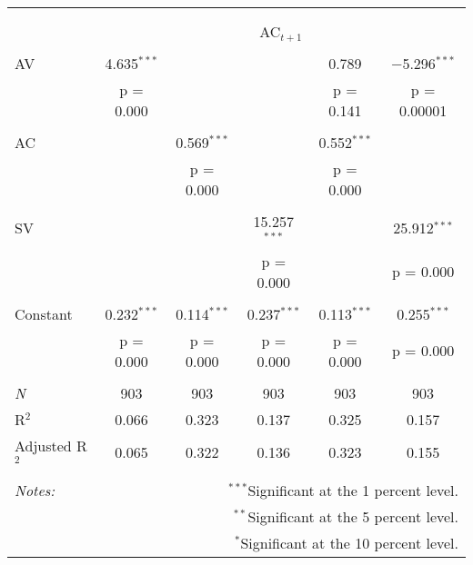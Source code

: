 
\begin{tabular}{@{\extracolsep{5pt}}lccccc} 
\\[-1.8ex]\hline 
\hline \\[-1.8ex] 
\\[-1.8ex] & \multicolumn{5}{c}{AC$_{t+1}$} \\ 
\hline \\[-1.8ex] 
 AV & 4.635$^{***}$ &  &  & 0.789 & $-$5.296$^{***}$ \\ 
  & p = 0.000 &  &  & p = 0.141 & p = 0.00001 \\ 
  & & & & & \\ 
 AC &  & 0.569$^{***}$ &  & 0.552$^{***}$ &  \\ 
  &  & p = 0.000 &  & p = 0.000 &  \\ 
  & & & & & \\ 
 SV &  &  & 15.257$^{***}$ &  & 25.912$^{***}$ \\ 
  &  &  & p = 0.000 &  & p = 0.000 \\ 
  & & & & & \\ 
 Constant & 0.232$^{***}$ & 0.114$^{***}$ & 0.237$^{***}$ & 0.113$^{***}$ & 0.255$^{***}$ \\ 
  & p = 0.000 & p = 0.000 & p = 0.000 & p = 0.000 & p = 0.000 \\ 
  & & & & & \\ 
\textit{N} & 903 & 903 & 903 & 903 & 903 \\ 
R$^{2}$ & 0.066 & 0.323 & 0.137 & 0.325 & 0.157 \\ 
Adjusted R$^{2}$ & 0.065 & 0.322 & 0.136 & 0.323 & 0.155 \\ 
\hline 
\hline \\[-1.8ex] 
\textit{Notes:} & \multicolumn{5}{r}{$^{***}$Significant at the 1 percent level.} \\ 
 & \multicolumn{5}{r}{$^{**}$Significant at the 5 percent level.} \\ 
 & \multicolumn{5}{r}{$^{*}$Significant at the 10 percent level.} \\ 
\end{tabular} 
